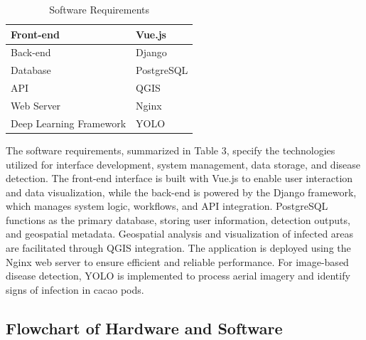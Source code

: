 \begin{table}[H]
	\centering
	\caption{Software Requirements}
	\label{tab:softreq}
	\begin{tabular}{ll}
		\toprule
		Front-end               & Vue.js     \\
		\midrule
		Back-end                & Django     \\
		\midrule
		Database                & PostgreSQL \\
		\midrule
		API                     & QGIS       \\
		\midrule
		Web Server              & Nginx      \\
		\midrule
		Deep Learning Framework & YOLO       \\
		\bottomrule
	\end{tabular}
\end{table}

The software requirements, summarized in Table 3, specify the technologies utilized for interface development, system management, data storage, and disease detection. The front-end interface is built with Vue.js to enable user interaction and data visualization, while the back-end is powered by the Django framework, which manages system logic, workflows, and API integration. PostgreSQL functions as the primary database, storing user information, detection outputs, and geospatial metadata. Geospatial analysis and visualization of infected areas are facilitated through QGIS integration. The application is deployed using the Nginx web server to ensure efficient and reliable performance. For image-based disease detection, YOLO is implemented to process aerial imagery and identify signs of infection in cacao pods.

\subsection{Flowchart of Hardware and Software}

